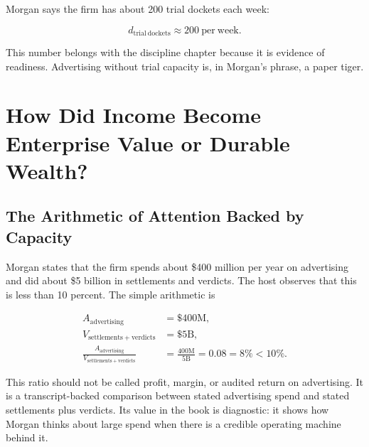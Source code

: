 \documentclass[11pt,oneside]{book}
\begin{document}
Morgan says the firm has about 200 trial dockets each week:

\begin{equation}
d_{\mathrm{trial\ dockets}}
\approx
200\ \mathrm{per\ week}.
\end{equation}

This number belongs with the discipline chapter because it is evidence of readiness. Advertising without trial capacity is, in Morgan's phrase, a paper tiger.

\chapter{How Did Income Become Enterprise Value or Durable Wealth?}

\section{The Arithmetic of Attention Backed by Capacity}

Morgan states that the firm spends about \$400 million per year on advertising and did about \$5 billion in settlements and verdicts. The host observes that this is less than 10 percent. The simple arithmetic is

\begin{align}
A_{\mathrm{advertising}} &= \$400\mathrm{M},\\
V_{\mathrm{settlements+verdicts}} &= \$5\mathrm{B},\\
\frac{A_{\mathrm{advertising}}}{V_{\mathrm{settlements+verdicts}}}
&=
\frac{400\mathrm{M}}{5\mathrm{B}}
=
0.08
=
8\%
<
10\%.
\end{align}

This ratio should not be called profit, margin, or audited return on advertising. It is a transcript-backed comparison between stated advertising spend and stated settlements plus verdicts. Its value in the book is diagnostic: it shows how Morgan thinks about large spend when there is a credible operating machine behind it.
\end{document}
